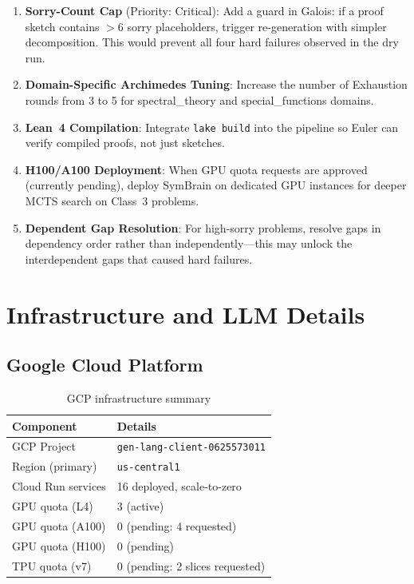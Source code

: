 \documentclass[12pt,a4paper]{report}
\theoremstyle{plain}
\theoremstyle{definition}
\theoremstyle{remark}
\begin{document}
\begin{enumerate}
  \item \textbf{Sorry-Count Cap} (Priority: Critical): Add a guard in Galois:
    if a proof sketch contains $> 6$ sorry placeholders, trigger re-generation
    with simpler decomposition. This would prevent all four hard failures
    observed in the dry run.
  \item \textbf{Domain-Specific Archimedes Tuning}: Increase the number of
    Exhaustion rounds from 3 to 5 for spectral\_theory and special\_functions
    domains.
  \item \textbf{Lean~4 Compilation}: Integrate \texttt{lake build} into the
    pipeline so Euler can verify compiled proofs, not just sketches.
  \item \textbf{H100/A100 Deployment}: When GPU quota requests are approved
    (currently pending), deploy SymBrain on dedicated GPU instances for
    deeper MCTS search on Class~3 problems.
  \item \textbf{Dependent Gap Resolution}: For high-sorry problems, resolve
    gaps in dependency order rather than independently—this may unlock
    the interdependent gaps that caused hard failures.
\end{enumerate}

\chapter{Infrastructure and LLM Details}
\label{app:infra}

\section{Google Cloud Platform}

\begin{table}[h!]
\centering
\begin{tabular}{ll}
\toprule
\textbf{Component} & \textbf{Details} \\
\midrule
GCP Project & \texttt{gen-lang-client-0625573011} \\
Region (primary) & \texttt{us-central1} \\
Cloud Run services & 16 deployed, scale-to-zero \\
GPU quota (L4) & 3 (active) \\
GPU quota (A100) & 0 (pending: 4 requested) \\
GPU quota (H100) & 0 (pending) \\
TPU quota (v7) & 0 (pending: 2 slices requested) \\
\bottomrule
\end{tabular}
\caption{GCP infrastructure summary}
\end{table}
\end{document}
